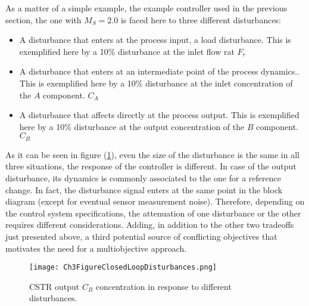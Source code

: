 As a matter of a simple example, the example controller used in the previous section, the one with $M_S=2.0$ is faced here to three different disturbances:

\begin{itemize}
\item A disturbance that  enters at the process input, a load disturbance. This is exemplified here by a 10\% disturbance at the inlet flow rat $F_r$ 
\item A disturbance that enters at  an intermediate point of the process dynamics.. This is exemplified here by a 10\% disturbance at the inlet concentration of the $A$ component. $C_A$
\item A disturbance that affects directly at the process output. This is exemplified here by a 10\% disturbance at the output concentration of the $B$ component. $C_B$
 \end{itemize} 

As it can be seen in figure (\ref{ch3:fig:Ch3FigureClosedLoopDisturbances}), even the size of the disturbance is the same in all three situations, the response of the controller is different. In case of the output disturbance, its dynamics is commonly associated to the one for a reference change. In fact, the disturbance signal enters at the same point in the block diagram (except for eventual sensor measurement noise). Therefore, depending on the control system specifications, the attenuation of one disturbance or the other requires different considerations. Adding, in addition to the other two tradeoffs just presented above, a third potential source of conflicting objectives that motivates the need for a multiobjective approach.


\begin{figure}[tb]
    \begin{center}
        \texttt{[image: Ch3FigureClosedLoopDisturbances.png]}
        \caption{CSTR output $C_B$ concentration in response to different disturbances.}
        \label{ch3:fig:Ch3FigureClosedLoopDisturbances}
    \end{center}
\end{figure}



